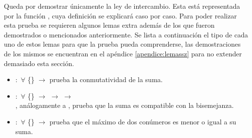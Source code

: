 Queda por demostrar únicamente la ley de intercambio. Esta está representada por la función , cuya definición se explicará caso por caso. Para poder realizar esta prueba se requieren algunos lemas extra además de los que fueron demostrados o mencionados anteriormente. Se lista a continuación el tipo de cada uno de estos lemas para que la prueba pueda comprenderse, las demostraciones de los mismos se encuentran en el apéndice \ref{apendice:lemassz} para no extender demasiado esta sección.
\begin{itemize}[noitemsep]
\item {} $:$ $\forall$  \{\} $\rightarrow$ \AgdaFunction{[}  \AgdaFunction{]}  \AgdaFunction{+}  \AgdaFunction{$\sim$}  \AgdaFunction{+}  prueba la conmutatividad de la suma.

\item {} $:$ $\forall$ \{\} $\rightarrow$ \AgdaFunction{[}  \AgdaFunction{]}  \AgdaFunction{$\sim$}  $\rightarrow$ \AgdaFunction{[}  \AgdaFunction{]}  \AgdaFunction{$\sim$}  $\rightarrow$ \AgdaFunction{[}  \AgdaFunction{]}  \AgdaFunction{+}  \\ \AgdaFunction{$\sim$}  \AgdaFunction{+} , análogamente a , prueba que la suma es compatible con la bisemejanza.

\item {} $:$ $\forall$ \{\} $\rightarrow$ \AgdaFunction{[}  \AgdaFunction{]}   \AgdaFunction{$\leq$}  \AgdaFunction{+}  prueba que el máximo de dos conúmeros es menor o igual a su suma.
\end{itemize}

